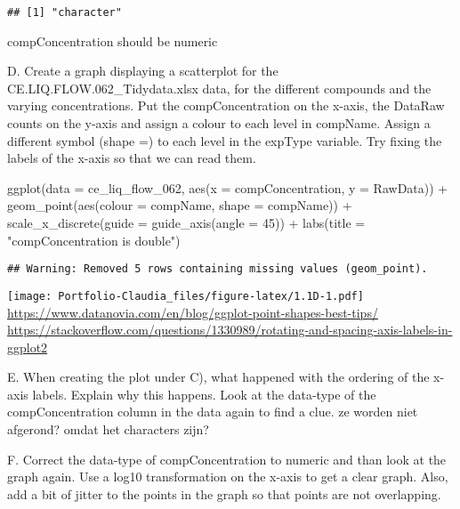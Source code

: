 \documentclass[
]{book}
\newenvironment{Shaded}{\begin{snugshade}}{\end{snugshade}}
\newcommand{\AttributeTok}[1]{\textcolor[rgb]{0.77,0.63,0.00}{#1}}
\newcommand{\DecValTok}[1]{\textcolor[rgb]{0.00,0.00,0.81}{#1}}
\newcommand{\FunctionTok}[1]{\textcolor[rgb]{0.00,0.00,0.00}{#1}}
\newcommand{\NormalTok}[1]{#1}
\newcommand{\SpecialCharTok}[1]{\textcolor[rgb]{0.00,0.00,0.00}{#1}}
\newcommand{\StringTok}[1]{\textcolor[rgb]{0.31,0.60,0.02}{#1}}
\begin{document}
\begin{verbatim}
## [1] "character"
\end{verbatim}

compConcentration should be numeric

D. Create a graph displaying a scatterplot for the CE.LIQ.FLOW.062\_Tidydata.xlsx data, for the different compounds and the varying concentrations. Put the compConcentration on the x-axis, the DataRaw counts on the y-axis and assign a colour to each level in compName. Assign a different symbol (shape =) to each level in the expType variable. Try fixing the labels of the x-axis so that we can read them.

\begin{Shaded}
\begin{Highlighting}[]
\FunctionTok{ggplot}\NormalTok{(}\AttributeTok{data =}\NormalTok{ ce\_liq\_flow\_062, }\FunctionTok{aes}\NormalTok{(}\AttributeTok{x =}\NormalTok{ compConcentration, }\AttributeTok{y =}\NormalTok{ RawData)) }\SpecialCharTok{+}
  \FunctionTok{geom\_point}\NormalTok{(}\FunctionTok{aes}\NormalTok{(}\AttributeTok{colour =}\NormalTok{ compName, }\AttributeTok{shape =}\NormalTok{ compName)) }\SpecialCharTok{+}
   \FunctionTok{scale\_x\_discrete}\NormalTok{(}\AttributeTok{guide =} \FunctionTok{guide\_axis}\NormalTok{(}\AttributeTok{angle =} \DecValTok{45}\NormalTok{)) }\SpecialCharTok{+}
  \FunctionTok{labs}\NormalTok{(}\AttributeTok{title =} \StringTok{"compConcentration is double"}\NormalTok{)}
\end{Highlighting}
\end{Shaded}

\begin{verbatim}
## Warning: Removed 5 rows containing missing values (geom_point).
\end{verbatim}

\texttt{[image: Portfolio-Claudia\_files/figure-latex/1.1D-1.pdf]}
\url{https://www.datanovia.com/en/blog/ggplot-point-shapes-best-tips/}
\url{https://stackoverflow.com/questions/1330989/rotating-and-spacing-axis-labels-in-ggplot2}

E. When creating the plot under C), what happened with the ordering of the x-axis labels. Explain why this happens. Look at the data-type of the compConcentration column in the data again to find a clue.
ze worden niet afgerond? omdat het characters zijn?

F. Correct the data-type of compConcentration to numeric and than look at the graph again. Use a log10 transformation on the x-axis to get a clear graph. Also, add a bit of jitter to the points in the graph so that points are not overlapping.
\end{document}
